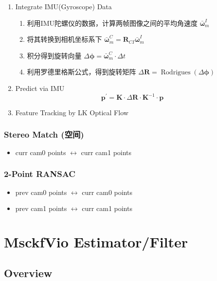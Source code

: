 \documentclass[12pt,a4paper]{article}
\begin{document}
\begin{enumerate}
	\item Integrate IMU(Gyroscope) Data
		\begin{enumerate}
			\item 利用IMU陀螺仪的数据，计算两帧图像之间的平均角速度 $\bar{\boldsymbol{\omega}}_m^I$
			\item 将其转换到相机坐标系下 $\bar{\boldsymbol{\omega}}_m^C = \mathbf{R}_{CI} \bar{\boldsymbol{\omega}}_m^I$
			\item 积分得到旋转向量 $\Delta \boldsymbol{\phi} = \bar{\boldsymbol{\omega}}_m^C \cdot \Delta t$
			\item 利用罗德里格斯公式，得到旋转矩阵 $\Delta \mathbf{R} = \operatorname{Rodrigues}(\Delta \boldsymbol{\phi})$
		\end{enumerate}
	
	\item Predict via IMU
		$$
		\mathbf{p}^\prime = 
		\mathbf{K} \cdot \Delta {\mathbf{R}} \cdot \mathbf{K}^{-1} \cdot \mathbf{p}
		$$
	
	\item Feature Tracking by LK Optical Flow
\end{enumerate}


\subsubsection{Stereo Match (空间)}

\begin{itemize}
	\item curr cam0 points $\longleftrightarrow$ curr cam1 points
\end{itemize}

\subsubsection{2-Point RANSAC}

\begin{itemize}
	\item prev cam0 points $\longleftrightarrow$ curr cam0 points
	\item prev cam1 points $\longleftrightarrow$ curr cam1 points
\end{itemize}


\section{MsckfVio Estimator/Filter}

\subsection{Overview}
\end{document}
